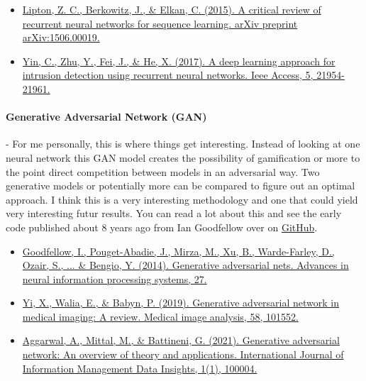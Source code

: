 \documentclass{article}
\begin{document}
\begin{itemize}
\item \href{https://arxiv.org/pdf/1506.00019.pdf}{Lipton, Z. C., Berkowitz, J., \& Elkan, C. (2015). A critical review of recurrent neural networks for sequence learning. arXiv preprint arXiv:1506.00019.} \cite{lipton2015critical} 
\item \href{https://ieeexplore.ieee.org/stamp/stamp.jsp?arnumber=8066291}{Yin, C., Zhu, Y., Fei, J., \& He, X. (2017). A deep learning approach for intrusion detection using recurrent neural networks. Ieee Access, 5, 21954-21961.} \cite{yin2017deep}
\end{itemize}

\paragraph{Generative Adversarial Network (GAN)} - For me personally, this is where things get interesting. Instead of looking at one neural network this GAN model creates the possibility of gamification or more to the point direct competition between models in an adversarial way. Two generative models or potentially more can be compared to figure out an optimal approach. I think this is a very interesting methodology and one that could yield very interesting futur results. You can read a lot about this and see the early code published about 8 years ago from Ian Goodfellow over on \href{https://github.com/goodfeli/adversarial}{GitHub}.

\begin{itemize}
\item \href{https://proceedings.neurips.cc/paper/2014/file/5ca3e9b122f61f8f06494c97b1afccf3-Paper.pdf}{Goodfellow, I., Pouget-Abadie, J., Mirza, M., Xu, B., Warde-Farley, D., Ozair, S., ... \& Bengio, Y. (2014). Generative adversarial nets. Advances in neural information processing systems, 27.} \cite{goodfellow2014generative}
\item \href{https://arxiv.org/pdf/1809.07294.pdf}{Yi, X., Walia, E., \& Babyn, P. (2019). Generative adversarial network in medical imaging: A review. Medical image analysis, 58, 101552.} \cite{yi2019generative}
\item \href{https://www.sciencedirect.com/science/article/pii/S2667096820300045}{Aggarwal, A., Mittal, M., \& Battineni, G. (2021). Generative adversarial network: An overview of theory and applications. International Journal of Information Management Data Insights, 1(1), 100004.} \cite{aggarwal2021generative}
\end{itemize}
\end{document}
